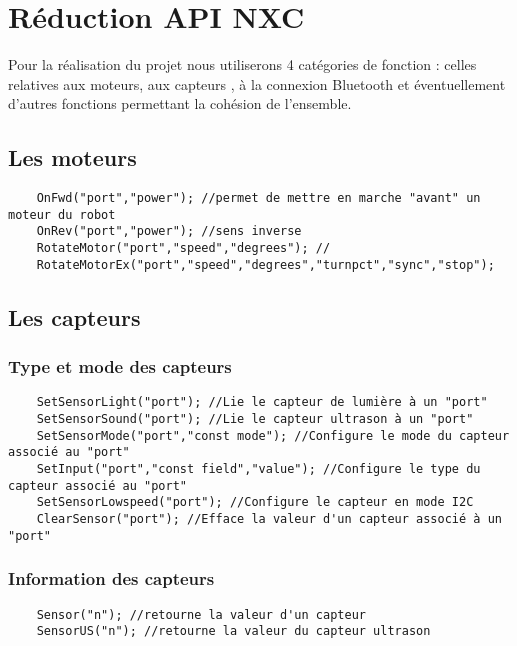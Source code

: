 \section{R\'{e}duction API NXC}
Pour la r\'{e}alisation du  projet nous utiliserons 4 cat\'{e}gories de fonction : celles relatives aux moteurs, aux capteurs , à la connexion Bluetooth et \'{e}ventuellement d'autres fonctions permettant la coh\'{e}sion de l'ensemble.

\subsection{Les moteurs }
\begin{verbatim}
	OnFwd("port","power"); //permet de mettre en marche "avant" un moteur du robot 
	OnRev("port","power"); //sens inverse
	RotateMotor("port","speed","degrees"); //
	RotateMotorEx("port","speed","degrees","turnpct","sync","stop"); 
\end{verbatim}

\subsection{Les capteurs }

\subsubsection{Type et mode des capteurs}
\begin{verbatim}
	SetSensorLight("port"); //Lie le capteur de lumière à un "port"
	SetSensorSound("port"); //Lie le capteur ultrason à un "port"
	SetSensorMode("port","const mode"); //Configure le mode du capteur associé au "port"
	SetInput("port","const field","value"); //Configure le type du capteur associé au "port"
	SetSensorLowspeed("port"); //Configure le capteur en mode I2C
	ClearSensor("port"); //Efface la valeur d'un capteur associé à un "port"

\end{verbatim}

\subsubsection{Information des capteurs}
\begin{verbatim}
	Sensor("n"); //retourne la valeur d'un capteur
	SensorUS("n"); //retourne la valeur du capteur ultrason

\end{verbatim}

